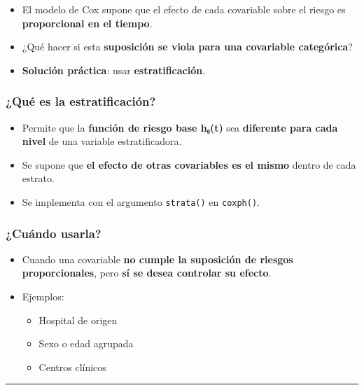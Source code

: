 \documentclass[
]{article}
\providecommand{\tightlist}{%
  \setlength{\itemsep}{0pt}\setlength{\parskip}{0pt}}\usepackage{longtable,booktabs,array}
\begin{document}
\begin{itemize}
\tightlist
\item
  El modelo de Cox supone que el efecto de cada covariable sobre el
  riesgo es \textbf{proporcional en el tiempo}.
\item
  ¿Qué hacer si esta \textbf{suposición se viola para una covariable
  categórica}?
\item
  \textbf{Solución práctica}: usar \textbf{estratificación}.
\end{itemize}

\subsubsection{¿Qué es la
estratificación?}\label{quuxe9-es-la-estratificaciuxf3n}

\begin{itemize}
\tightlist
\item
  Permite que la \textbf{función de riesgo base h₀(t)} sea
  \textbf{diferente para cada nivel} de una variable estratificadora.
\item
  Se supone que \textbf{el efecto de otras covariables es el mismo}
  dentro de cada estrato.
\item
  Se implementa con el argumento \texttt{strata()} en \texttt{coxph()}.
\end{itemize}

\subsubsection{¿Cuándo usarla?}\label{cuuxe1ndo-usarla}

\begin{itemize}
\tightlist
\item
  Cuando una covariable \textbf{no cumple la suposición de riesgos
  proporcionales}, pero \textbf{sí se desea controlar su efecto}.
\item
  Ejemplos:

  \begin{itemize}
  \tightlist
  \item
    Hospital de origen
  \item
    Sexo o edad agrupada
  \item
    Centros clínicos
  \end{itemize}
\end{itemize}

\begin{center}\rule{0.5\linewidth}{0.5pt}\end{center}
\end{document}
